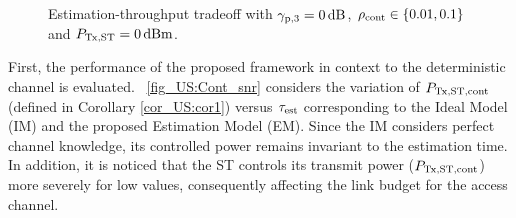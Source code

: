 \begin{figure}[!ht]
\vspace{-2mm}

\centering
{}
\caption{Estimation-throughput tradeoff with ${\gamma}_{\text{p,3}} = \SI{0}{dB}$, $\rho_{\text{cont}} \in \{0.01, 0.1\}$ and $P_{\text{Tx,ST}} = \SI{0}{dBm}$.}
\label{fig_US:ETT}
\end{figure}
First, the performance of the proposed framework in context to the deterministic channel is evaluated. \figurename~\ref{fig_US:Cont_snr} considers the variation of $P_{\text{Tx,ST,cont}}$ (defined in Corollary \ref{cor_US:cor1}) versus $\tau_{\text{est}}$ corresponding to the Ideal Model (IM) and the proposed Estimation Model (EM). Since the IM considers perfect channel knowledge, its controlled power remains invariant to the estimation time. In addition, it is noticed that the ST controls its transmit power ($P_{\text{Tx,ST,cont}}$) more severely for low values, consequently affecting the link budget for the access channel. %
